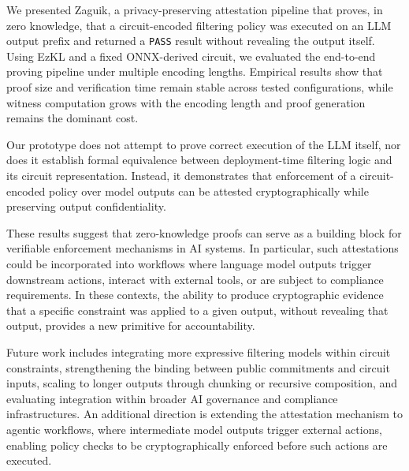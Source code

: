 \documentclass[10pt,conference,a4paper]{IEEEtran}
\begin{document}
We presented Zaguik, a privacy-preserving attestation pipeline that proves, in zero knowledge, that a circuit-encoded filtering policy was executed on an LLM output prefix and returned a \texttt{PASS} result without revealing the output itself. Using EzKL and a fixed ONNX-derived circuit, we evaluated the end-to-end proving pipeline under multiple encoding lengths. Empirical results show that proof size and verification time remain stable across tested configurations, while witness computation grows with the encoding length and proof generation remains the dominant cost.

Our prototype does not attempt to prove correct execution of the LLM itself, nor does it establish formal equivalence between deployment-time filtering logic and its circuit representation. Instead, it demonstrates that enforcement of a circuit-encoded policy over model outputs can be attested cryptographically while preserving output confidentiality.

These results suggest that zero-knowledge proofs can serve as a building block for verifiable enforcement mechanisms in AI systems. In particular, such attestations could be incorporated into workflows where language model outputs trigger downstream actions, interact with external tools, or are subject to compliance requirements. In these contexts, the ability to produce cryptographic evidence that a specific constraint was applied to a given output, without revealing that output, provides a new primitive for accountability.

Future work includes integrating more expressive filtering models within circuit constraints, strengthening the binding between public commitments and circuit inputs, scaling to longer outputs through chunking or recursive composition, and evaluating integration within broader AI governance and compliance infrastructures. An additional direction is extending the attestation mechanism to agentic workflows, where intermediate model outputs trigger external actions, enabling policy checks to be cryptographically enforced before such actions are executed.
\end{document}
